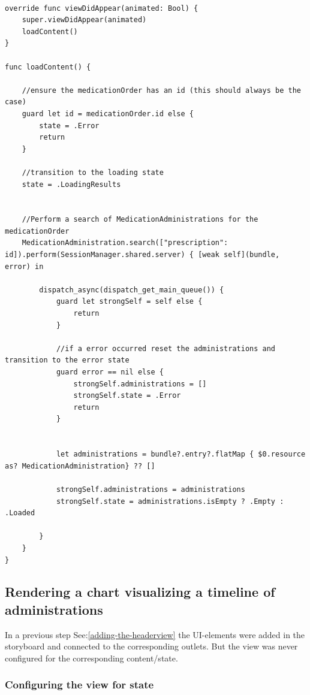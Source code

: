\documentclass{article}
\begin{document}
\begin{verbatim}

override func viewDidAppear(animated: Bool) {
    super.viewDidAppear(animated)
    loadContent()
}

func loadContent() {

    //ensure the medicationOrder has an id (this should always be the case)
    guard let id = medicationOrder.id else {
        state = .Error
        return
    }

    //transition to the loading state
    state = .LoadingResults


    //Perform a search of MedicationAdministrations for the medicationOrder
    MedicationAdministration.search(["prescription": id]).perform(SessionManager.shared.server) { [weak self](bundle, error) in

        dispatch_async(dispatch_get_main_queue()) {
            guard let strongSelf = self else {
                return
            }

            //if a error occurred reset the administrations and transition to the error state
            guard error == nil else {
                strongSelf.administrations = []
                strongSelf.state = .Error
                return
            }


            let administrations = bundle?.entry?.flatMap { $0.resource as? MedicationAdministration} ?? []

            strongSelf.administrations = administrations
            strongSelf.state = administrations.isEmpty ? .Empty : .Loaded

        }
    }
}
\end{verbatim}

\subsection{Rendering a chart visualizing a timeline of administrations}\label{step-7.3---implementing-medicationdetailviewcontroller---rendering-a-chart-visualizing-a-timeline-of-administrations}
In a previous step See:\ref{adding-the-headerview} the UI-elements were
added in the storyboard and connected to the corresponding outlets. But
the view was never configured for the corresponding content/state.

\subsubsection{Configuring the view for state}\label{configuring-the-view-for-state}
\end{document}
